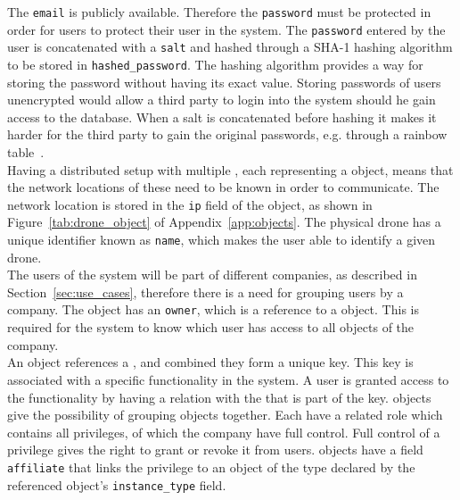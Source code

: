 The \verb+email+ is publicly available.
Therefore the \verb+password+ must be protected in order for users to protect their user in the system.
The \verb+password+ entered by the user is concatenated with a \verb+salt+ and hashed through a SHA-1 hashing algorithm to be stored in \verb+hashed_password+.
The hashing algorithm provides a way for storing the password without having its exact value.
Storing passwords of users unencrypted would allow a third party to login into the system should he gain access to the database.
When a salt is concatenated before hashing it makes it harder for the third party to gain the original passwords, e.g. through a rainbow table~\cite{rainbow}. \\

Having a distributed setup with multiple , each representing a  object, means that the network locations of these need to be known in order to communicate.
The network location is stored in the \verb+ip+ field of the  object, as shown in Figure~\ref{tab:drone_object} of Appendix~\ref{app:objects}.
The physical drone has a unique identifier known as \verb+name+, which makes the user able to identify a given drone. \\

The users of the system will be part of different companies, as described in Section~\ref{sec:use_cases}, therefore there is a need for grouping users by a company.
The  object has an \verb+owner+, which is a reference to a  object.
This is required for the system to know which user has access to all  objects of the company. \\

An  object references a , and combined they form a unique key.
This key is associated with a specific functionality in the system.
A user is granted access to the functionality by having a relation with the  that is part of the key.
 objects give the possibility of grouping  objects together.
Each  have a related role which contains all privileges, of which the company have full control.
Full control of a privilege gives the right to grant or revoke it from users.
 objects have a field \verb+affiliate+ that links the privilege to an object of the type declared by the referenced  object's \verb+instance_type+ field. \\

